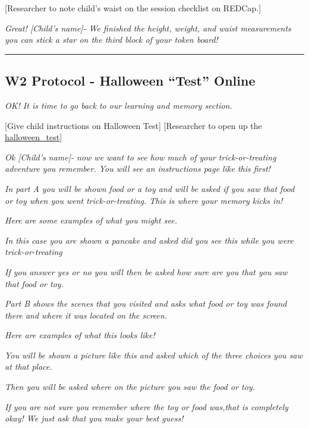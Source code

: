 \documentclass[]{book}
\begin{document}
{[}Researcher to note child's waist on the session checklist on REDCap.{]}

\emph{Great! {[}Child's name{]}- We finished the height, weight, and waist measurements you can stick a star on the third block of your token board!}

\begin{center}\rule{0.5\linewidth}{0.5pt}\end{center}

\hypertarget{w2-protocol---halloween-test-online}{%
\subsection{W2 Protocol - Halloween ``Test'' Online}\label{w2-protocol---halloween-test-online}}

\emph{OK! It is time to go back to our learning and memory section.}

{[}Give child instructions on Halloween Test{]} {[}Researcher to open up the \href{https://app.box.com/file/784728666967}{halloween\_test}{]}

\emph{Ok {[}Child's name{]}- now we want to see how much of your trick-or-treating adventure you remember. You will see an instructions page like this first!}

\emph{In part A you will be shown food or a toy and will be asked if you saw that food or toy when you went trick-or-treating. This is where your memory kicks in!}

\emph{Here are some examples of what you might see.}

\emph{In this case you are shown a pancake and asked did you see this while you were trick-or-treating}

\emph{If you answer yes or no you will then be asked how sure are you that you saw that food or toy.}

\emph{Part B shows the scenes that you visited and asks what food or toy was found there and where it was located on the screen.}

\emph{Here are examples of what this looks like!}

\emph{You will be shown a picture like this and asked which of the three choices you saw at that place.}

\emph{Then you will be asked where on the picture you saw the food or toy.}

\emph{If you are not sure you remember where the toy or food was,that is completely okay! We just ask that you make your best guess!}
\end{document}
